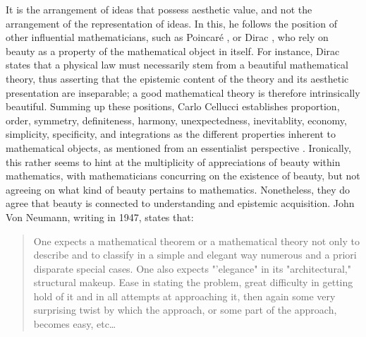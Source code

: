 It is the arrangement of ideas that possess aesthetic value, and not the arrangement of the representation of ideas. In this, he follows the position of other influential mathematicians, such as Poincaré \citep{poincare_science_1908}, or Dirac \citep{kragh_paul_2002}, who rely on beauty as a property of the mathematical object in itself. For instance, Dirac states that a physical law must necessarily stem from a beautiful mathematical theory, thus asserting that the epistemic content of the theory and its aesthetic presentation are inseparable; a good mathematical theory is therefore intrinsically beautiful. Summing up these positions, Carlo Cellucci establishes proportion, order, symmetry, definiteness, harmony, unexpectedness, inevitablity, economy, simplicity, specificity,  and integrations as the different properties inherent to mathematical objects, as mentioned from an essentialist perspective \citep{cellucci_mathematical_2015}. Ironically, this rather seems to hint at the multiplicity of appreciations of beauty within mathematics, with mathematicians concurring on the existence of beauty, but not agreeing on what kind of beauty pertains to mathematics. Nonetheless, they do agree that beauty is connected to understanding and epistemic acquisition. John Von Neumann, writing in 1947, states that:

\begin{quote}
    One expects a mathematical theorem or a mathematical theory not only to describe and to classify in a simple and elegant way numerous and a priori disparate special cases. One also expects "'elegance" in its "architectural," structural makeup. Ease in stating the problem, great difficulty in getting hold of it and in all attempts at approaching it, then again some very surprising twist by which the approach, or some part of the approach, becomes easy, etc\dots \citep{vonneumann_mathematician_1947}
\end{quote}

